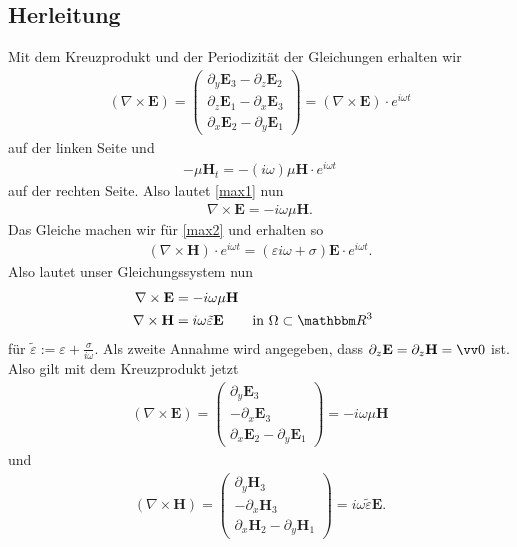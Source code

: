 \documentclass[ngerman,11pt,a4paper,titlepage]{article}
\begin{document}
\subsection{Herleitung}
Mit dem Kreuzprodukt und der Periodizität der Gleichungen erhalten wir
\begin{align*}
  (\nabla \times \mathbf E) =
  \begin{pmatrix}
    \partial_y \mathbf E_3 - \partial_z \mathbf E_2 \\
    \partial_z \mathbf E_1 - \partial_x \mathbf E_3 \\
    \partial_x \mathbf E_2 - \partial_y \mathbf E_1
  \end{pmatrix}
  = (\nabla \times \mathbf E) \cdot e^{i\omega t} 
\end{align*}
auf der linken Seite und
\begin{align*}
  -\mu \mathbf H_t = -(i\omega)\mu \mathbf H \cdot e^{i\omega t} 
\end{align*}
auf der rechten Seite. Also lautet \eqref{max1} nun
\begin{align*}
  \nabla \times \mathbf E = -i\omega \mu \mathbf H.
\end{align*}
Das Gleiche machen wir für \eqref{max2} und erhalten so
\begin{align*}
  (\nabla \times \mathbf H) \cdot e^{i\omega t} = (\varepsilon i \omega + \sigma)\mathbf E \cdot e^{i\omega t}.
\end{align*}
Also lautet unser Gleichungssystem nun
\begin{align*}
  \nabla \times \mathbf E &= -i\omega \mu \mathbf H \\
  \nabla \times \mathbf H &= i\omega \tilde \varepsilon \mathbf E && \text{in } \Omega \subset \mathbbm R^3
\end{align*}
für $\tilde \varepsilon := \varepsilon + \frac{\sigma}{i\omega}$.
Als zweite Annahme wird angegeben, dass $\partial_z \mathbf E = \partial_z \mathbf H = \vv 0$ ist. Also gilt mit dem Kreuzprodukt jetzt
\begin{align}
  (\nabla \times \mathbf E) =
  \begin{pmatrix}
    \partial_y \mathbf E_3\\
    - \partial_x \mathbf E_3 \\
    \partial_x \mathbf E_2 - \partial_y \mathbf E_1
  \end{pmatrix}
  = -i\omega \mu \mathbf H
  \label{neu1}
\end{align}
und
\begin{align}
  (\nabla \times \mathbf H) =
  \begin{pmatrix}
    \partial_y \mathbf H_3\\
    - \partial_x \mathbf H_3 \\
    \partial_x \mathbf H_2 - \partial_y \mathbf H_1
  \end{pmatrix}
  = i\omega \tilde \varepsilon \mathbf E.
  \label{neu2}
\end{align}
\end{document}

